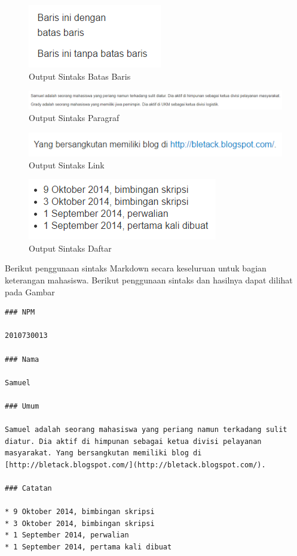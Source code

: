 \begin{figure}[p]
\centering
\includegraphics[scale=1]{Gambar/batasbaris.png}
\caption[Output Sintaks Batas Baris]{Output Sintaks Batas Baris} 
\label{fig:batasbaris}
\end{figure}

\begin{figure}[p]
\centering
\includegraphics[scale=0.5]{Gambar/paragraf.png}
\caption[Output Sintaks Paragraf]{Output Sintaks Paragraf} 
\label{fig:paragraf}
\end{figure}

\begin{figure}[p]
\centering
\includegraphics[scale=1]{Gambar/link.png}
\caption[Output Sintaks Link]{Output Sintaks Link} 
\label{fig:link}
\end{figure}

\begin{figure}[p]
\centering
\includegraphics[scale=1]{Gambar/daftar.png}
\caption[Output Sintaks Daftar]{Output Sintaks Daftar} 
\label{fig:daftar}
\end{figure}

Berikut penggunaan sintaks Markdown secara keseluruan untuk bagian keterangan
mahasiswa. Berikut penggunaan sintaks dan hasilnya dapat dilihat pada Gambar
\begin{lstlisting}[basicstyle=\footnotesize]
### NPM

2010730013

### Nama

Samuel
			
### Umum
			
Samuel adalah seorang mahasiswa yang periang namun terkadang sulit diatur. Dia aktif di himpunan sebagai ketua divisi pelayanan masyarakat. Yang bersangkutan memiliki blog di [http://bletack.blogspot.com/](http://bletack.blogspot.com/).
			
### Catatan
			
* 9 Oktober 2014, bimbingan skripsi
* 3 Oktober 2014, bimbingan skripsi
* 1 September 2014, perwalian
* 1 September 2014, pertama kali dibuat
\end{lstlisting}

